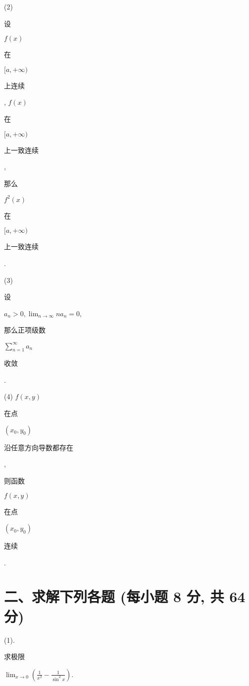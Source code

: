 \documentclass[10pt]{article}
\begin{document}
(2) \begin{CJK}{UTF8}{mj}设\end{CJK} $f(x)$ \begin{CJK}{UTF8}{mj}在\end{CJK} $[a,+\infty)$ \begin{CJK}{UTF8}{mj}上连续\end{CJK}, $f(x)$ \begin{CJK}{UTF8}{mj}在\end{CJK} $[a,+\infty)$ \begin{CJK}{UTF8}{mj}上一致连续\end{CJK}, \begin{CJK}{UTF8}{mj}那么\end{CJK} $f^{2}(x)$ \begin{CJK}{UTF8}{mj}在\end{CJK} $[a,+\infty)$ \begin{CJK}{UTF8}{mj}上一致连续\end{CJK}.

(3) \begin{CJK}{UTF8}{mj}设\end{CJK} $a_{n}>0, \lim _{n \rightarrow \infty} n a_{n}=0$, \begin{CJK}{UTF8}{mj}那么正项级数\end{CJK} $\sum_{n=1}^{\infty} a_{n}$ \begin{CJK}{UTF8}{mj}收敛\end{CJK}.

(4) $f(x, y)$ \begin{CJK}{UTF8}{mj}在点\end{CJK} $\left(x_{0}, y_{0}\right)$ \begin{CJK}{UTF8}{mj}沿任意方向导数都存在\end{CJK}, \begin{CJK}{UTF8}{mj}则函数\end{CJK} $f(x, y)$ \begin{CJK}{UTF8}{mj}在点\end{CJK} $\left(x_{0}, y_{0}\right)$ \begin{CJK}{UTF8}{mj}连续\end{CJK}.

\section{二、求解下列各题 (每小题 8 分, 共 64 分)}
(1). \begin{CJK}{UTF8}{mj}求极限\end{CJK} $\lim _{x \rightarrow 0}\left(\frac{1}{x^{2}}-\frac{1}{\sin ^{2} x}\right)$.
\end{document}
